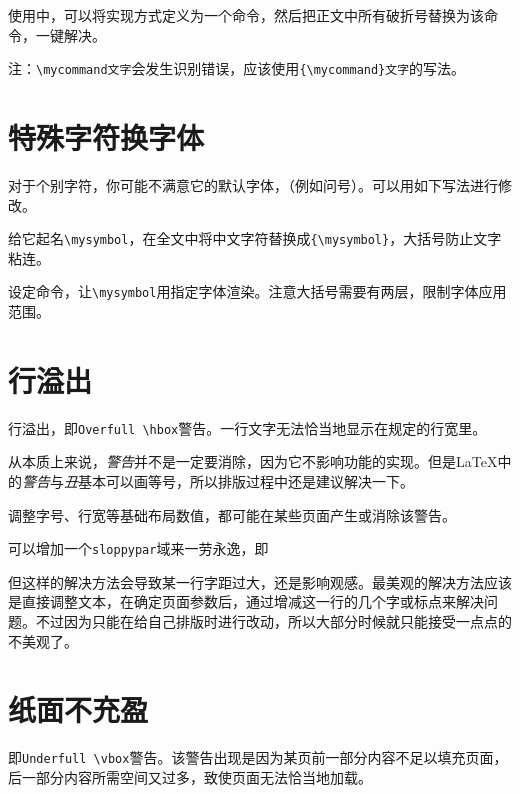 \documentclass[10pt,openany]{book}
\begin{document}


使用中，可以将实现方式定义为一个命令，然后把正文中所有破折号替换为该命令，一键解决。

注：\texttt{\textbackslash{}mycommand\hspace{-0.1em}文字}会发生识别错误，应该使用\texttt{\{\textbackslash{}mycommand\}文字}的写法。

\section{特殊字符换字体}

对于个别字符，你可能不满意它的默认字体，（例如问号）。可以用如下写法进行修改。

给它起名\texttt{\textbackslash{}mysymbol}，在全文中将中文字符替换成\texttt{\{\textbackslash{}mysymbol\}}，大括号防止文字粘连。

设定命令，让\texttt{\textbackslash{}mysymbol}用指定字体渲染。注意大括号需要有两层，限制字体应用范围。



\section{行溢出}

行溢出，即\texttt{Overfull\ \textbackslash{}hbox}警告。一行文字无法恰当地显示在规定的行宽里。

从本质上来说，\textit{警告}并不是一定要消除，因为它不影响功能的实现。但是\LaTeX 中的\textit{警告}与\textit{丑}基本可以画等号，所以排版过程中还是建议解决一下。

调整字号、行宽等基础布局数值，都可能在某些页面产生或消除该警告。

可以增加一个\texttt{sloppypar}域来一劳永逸，即



但这样的解决方法会导致某一行字距过大，还是影响观感。最美观的解决方法应该是直接调整文本，在确定页面参数后，通过增减这一行的几个字或标点来解决问题。不过因为只能在给自己排版时进行改动，所以大部分时候就只能接受一点点的不美观了。

\section{纸面不充盈}

即\texttt{Underfull\ \textbackslash{}vbox}警告。该警告出现是因为某页前一部分内容不足以填充页面，后一部分内容所需空间又过多，致使页面无法恰当地加载。
\end{document}
